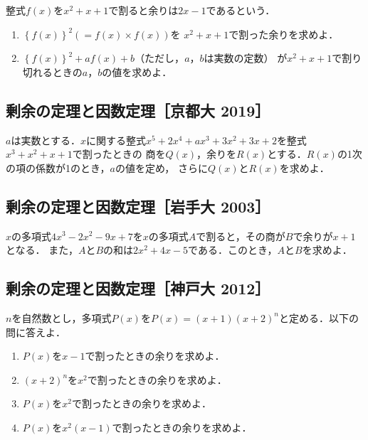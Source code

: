 \documentclass[../../ms_q.tex]{subfiles}
\begin{document}
整式$f(x)$を$x^2+x+1$で割ると余りは$2x-1$であるという．

\begin{enumerate}

    \item $\left\{f(x)\right\}^2\left(=f(x)\times f(x)\right)$を
        $x^2+x+1$で割った余りを求めよ．
    \item $\left\{f(x)\right\}^2+af(x)+b$（ただし，$a$，$b$は実数の定数）
        が$x^2+x+1$で割り切れるときの$a$，$b$の値を求めよ．

\end{enumerate}

\vspace{2cm}
\vfill

\subsection{剰余の定理と因数定理［京都大 2019］}

$a$は実数とする．$x$に関する整式$x^5+2x^4+ax^3+3x^2+3x+2$を整式$x^3+x^2+x+1$で割ったときの
商を$Q(x)$，余りを$R(x)$とする．$R(x)$の1次の項の係数が1のとき，$a$の値を定め，
さらに$Q(x)$と$R(x)$を求めよ．

\vspace{2cm}
\vfill

\subsection{剰余の定理と因数定理［岩手大 2003］}

$x$の多項式$4x^3-2x^2-9x+7$を$x$の多項式$A$で割ると，その商が$B$で余りが$x+1$となる．
また，$A$と$B$の和は$2x^2+4x-5$である．このとき，$A$と$B$を求めよ．

\vspace{2cm}
\vfill

\subsection{剰余の定理と因数定理［神戸大 2012］}

$n$を自然数とし，多項式$P(x)$を$P(x)=(x+1)(x+2)^n$と定める．以下の問に答えよ．

\begin{enumerate}

    \item $P(x)$を$x-1$で割ったときの余りを求めよ．
    
    \item $(x+2)^n$を$x^2$で割ったときの余りを求めよ．
    
    \item $P(x)$を$x^2$で割ったときの余りを求めよ． 

    \item $P(x)$を$x^2(x-1)$で割ったときの余りを求めよ．

\end{enumerate}
\end{document}
